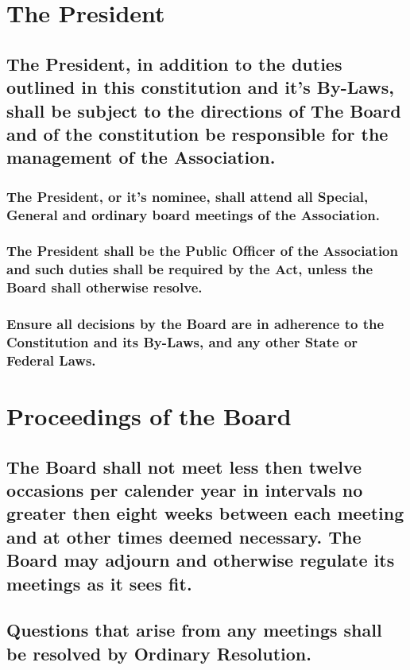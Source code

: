 \documentclass{article}
\newenvironment{subs}
  {\adjustwidth{2em}{0pt}}
  {\endadjustwidth}
\begin{document}
\section{The President}
\begin{subs}
\subsection{The President, in addition to the duties outlined in this constitution and it’s By-Laws, shall be subject to the directions of The Board and of the constitution be responsible for the management of the Association.}
\begin{subs}
\subsubsection{The President, or it’s nominee, shall attend all Special, General and ordinary board meetings of the Association.}
\subsubsection{The President shall be the Public Officer of the Association and such duties shall be required by the Act, unless the Board shall otherwise resolve.}
\subsubsection{Ensure all decisions by the Board are in adherence to the Constitution and its By-Laws, and any other State or Federal Laws.}
\end{subs}
\end{subs}

\section{Proceedings of the Board}
\begin{subs}
\subsection{The Board shall not meet less then twelve occasions per calender year in intervals no greater then eight weeks between each meeting and at other times deemed necessary. The Board may adjourn and otherwise regulate its meetings as it sees fit.}
\subsection{Questions that arise from any meetings shall be resolved by Ordinary Resolution.}
\end{subs}
\newpage
\end{document}
